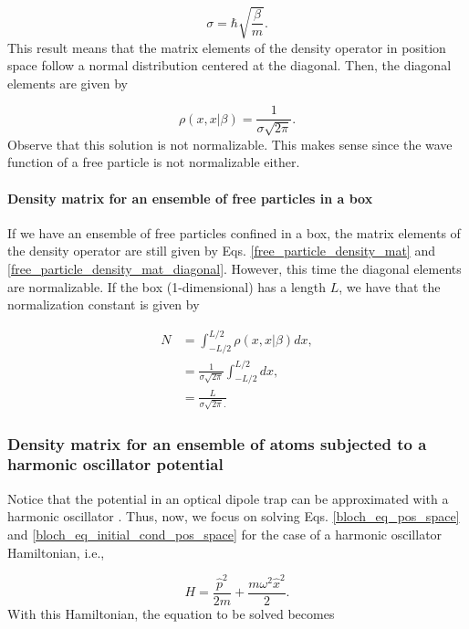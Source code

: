 \documentclass{article}
\begin{document}
\begin{equation}\label{free_particle_density_mat}
    \sigma = \hbar \sqrt{\frac{\beta}{m}}.
\end{equation}
%
This result means that the matrix elements of the density operator in position space follow a normal distribution centered at the diagonal. Then, the diagonal elements are given by

\begin{equation}\label{free_particle_density_mat_diagonal}
    \rho(x, x | \beta) = \frac{1}{\sigma \sqrt{2\pi}}.
\end{equation}
%
Observe that this solution is not normalizable. This makes sense since the wave function of a free particle is not normalizable either.

\paragraph{Density matrix for an ensemble of free particles in a box}
If we have an ensemble of free particles confined in a box, the matrix elements of the density operator are still given by Eqs. \ref{free_particle_density_mat} and \ref{free_particle_density_mat_diagonal}. However, this time the diagonal elements are normalizable. If the box (1-dimensional) has a length $L$, we have that the normalization constant is given by

\begin{equation}
   \begin{split}
        N & = \int_{-L/2}^{L/2} \rho(x, x | \beta) dx, \\ & = \frac{1}{\sigma \sqrt{2\pi}} \int_{-L/2}^{L/2} dx, \\ & = \frac{L}{\sigma \sqrt{2\pi}.}
   \end{split}
\end{equation}

\subsubsection{Density matrix for an ensemble of atoms subjected to a harmonic oscillator potential}
Notice that the potential in an optical dipole trap can be approximated with a harmonic oscillator \cite{Metcalf1999}. Thus, now, we focus on solving Eqs. \ref{bloch_eq_pos_space} and \ref{bloch_eq_initial_cond_pos_space} for the case of a harmonic oscillator Hamiltonian, i.e.,

\begin{equation}
    H = \frac{\hat{p}^{2}}{2m} + \frac{m \omega^{2} \hat{x}^{2}}{2}.
\end{equation}
%
With this Hamiltonian, the equation to be solved becomes
\end{document}
